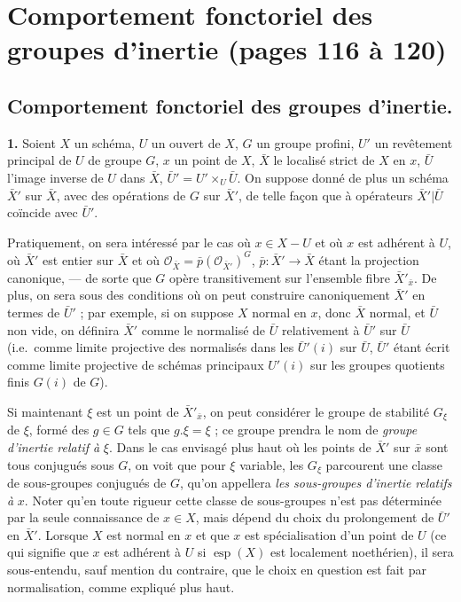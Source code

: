 \documentclass[11pt,a4paper]{article}
\begin{document}
\section*{Comportement fonctoriel des groupes d'inertie (pages 116 à 120)}


\subsection*{Comportement fonctoriel des groupes d'inertie.}

\textbf{1.} Soient $X$ un schéma, $U$ un ouvert de $X$, $G$ un groupe profini,
$U'$ un revêtement principal de $U$ de groupe $G$, $x$ un point  de
$X$, $\bar{X}$ le localisé strict de $X$ en $x$, $\bar{U}$ l'image inverse de
$U$ dans $\bar{X}$, $\bar{U}' = U' \times_{U} \bar{U}$. On suppose donné de
plus un schéma $\bar{X}'$ sur $\bar{X}$, avec des opérations de $G$ sur
$\bar{X}'$, de telle façon que   à
opérateurs $\bar{X}'|\bar{U}$ coïncide avec $\bar{U}'$.

Pratiquement, on sera intéressé par le cas où $x \in X - U$ et où $x$ est
adhérent à $U$, où $\bar{X}'$ est entier sur $\bar{X}$ et où
$\mathcal{O}_{\bar{X}} = \bar{p}(\mathcal{O}_{\bar{X}'})^{G}$, $\bar{p} :
\bar{X}' \to \bar{X}$ étant la projection canonique, --- de sorte que $G$ opère
transitivement sur l'ensemble fibre $\bar{X}'_{\bar{x}}$. De plus, on
\struck{\ill{}} sera  sous des conditions où on peut
construire canoniquement $\bar{X}'$ en termes de $\bar{U}'$ ; par exemple, si
on suppose $X$ normal en $x$, donc $\bar{X}$ normal, et $\bar{U}$ non vide, on
définira $\bar{X}'$ comme le normalisé de $\bar{U}$ relativement à $\bar{U}'$
sur $\bar{U}$ (i.e.\ comme limite projective des normalisés dans les
$\bar{U}'(i)$ sur $\bar{U}$, $\bar{U}'$ étant écrit comme limite projective de
schémas principaux $U'(i)$ sur les groupes quotients finis $G(i)$ de $G$).

Si maintenant \struck{\ill{}} $\xi$ est un point de $\bar{X}'_{\bar{x}}$, on
peut considérer le groupe de stabilité $G_{\xi}$ de $\xi$, formé des $g \in G$
tels que $g.\xi = \xi$ ; ce groupe prendra le nom de \emph{groupe d'inertie
relatif à} $\xi$. Dans le cas envisagé plus haut où les points de $\bar{X}'$
sur $\bar{x}$ sont tous conjugués sous $G$, on voit que pour $\xi$ variable,
les $G_{\xi}$ parcourent une classe de sous-groupes conjugués de $G$, qu'on
appellera  \emph{les sous-groupes d'inertie}
 \emph{relatifs à} $x$. Noter qu'en toute rigueur cette classe de
sous-groupes \struck{\ill{}} n'est pas déterminée par la seule connaissance de
$x \in X$, mais dépend du choix du prolongement de $\bar{U}'$ en $\bar{X}'$.
Lorsque $X$ est normal en $x$ et que $x$ est spécialisation d'un point de $U$
(ce qui signifie que $x$ est adhérent à $U$ si $\operatorname{esp}(X)$ est
localement noethérien), il sera sous-entendu, sauf mention du contraire, que le
choix en question est fait par normalisation, comme expliqué plus haut.
\end{document}
